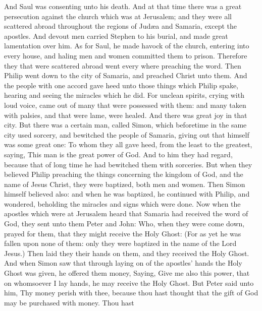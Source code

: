  And Saul was consenting unto his death. And at that time
there was a great persecution against the church which was at Jerusalem;
and they were all scattered abroad throughout the regions of Judæa and
Samaria, except the apostles.  And devout men carried
Stephen to his burial, and made great lamentation over him.
 As for Saul, he made havock of the church, entering into
every house, and haling men and women committed them to prison.
 Therefore they that were scattered abroad went every
where preaching the word.  Then Philip went down to the
city of Samaria, and preached Christ unto them.  And the
people with one accord gave heed unto those things which Philip spake,
hearing and seeing the miracles which he did.  For unclean
spirits, crying with loud voice, came out of many that were possessed
with them: and many taken with palsies, and that were lame, were healed.
 And there was great joy in that city.  But
there was a certain man, called Simon, which beforetime in the same city
used sorcery, and bewitched the people of Samaria, giving out that
himself was some great one:  To whom they all gave heed,
from the least to the greatest, saying, This man is the great power of
God.  And to him they had regard, because that of long
time he had bewitched them with sorceries.  But when they
believed Philip preaching the things concerning the kingdom of God, and
the name of Jesus Christ, they were baptized, both men and women.
 Then Simon himself believed also: and when he was
baptized, he continued with Philip, and wondered, beholding the miracles
and signs which were done.  Now when the apostles which
were at Jerusalem heard that Samaria had received the word of God, they
sent unto them Peter and John:  Who, when they were come
down, prayed for them, that they might receive the Holy Ghost:
 (For as yet he was fallen upon none of them: only they
were baptized in the name of the Lord Jesus.)  Then laid
they their hands on them, and they received the Holy Ghost.
 And when Simon saw that through laying on of the
apostles' hands the Holy Ghost was given, he offered them money,
 Saying, Give me also this power, that on whomsoever I
lay hands, he may receive the Holy Ghost.  But Peter said
unto him, Thy money perish with thee, because thou hast thought that the
gift of God may be purchased with money.  Thou hast
